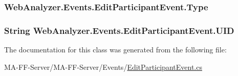 \subsubsection[{Type}]{ Web\+Analyzer.\+Events.\+Edit\+Participant\+Event.\+Type\hspace{0.3cm}{\ttfamily [get]}}\label{class_web_analyzer_1_1_events_1_1_edit_participant_event_a26e1781598d44a49a9512df5442eb4a6}
\hypertarget{class_web_analyzer_1_1_events_1_1_edit_participant_event_acef746eb86f5262d48b583822b20cfcc}{}
\subsubsection[{U\+I\+D}]{\setlength{\rightskip}{0pt plus 5cm}String Web\+Analyzer.\+Events.\+Edit\+Participant\+Event.\+U\+I\+D\hspace{0.3cm}{\ttfamily [get]}}\label{class_web_analyzer_1_1_events_1_1_edit_participant_event_acef746eb86f5262d48b583822b20cfcc}






The documentation for this class was generated from the following file\+:\begin{DoxyCompactItemize}
\item 
M\+A-\/\+F\+F-\/\+Server/\+M\+A-\/\+F\+F-\/\+Server/\+Events/\hyperlink{_edit_participant_event_8cs}{Edit\+Participant\+Event.\+cs}\end{DoxyCompactItemize}
